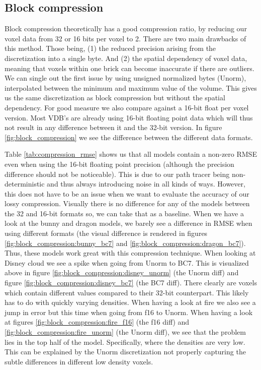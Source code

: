 \subsection{Block compression} \label{results:block_compression}
Block compression theoretically has a good compression ratio, by reducing our voxel data from 32 or 16 bits per voxel to 2. There are two main drawbacks of this method. Those being, (1) the reduced precision arising from the discretization into a single byte. And (2) the spatial dependency of voxel data, meaning that voxels within one brick can become inaccurate if there are outliers. We can single out the first issue by using unsigned normalized bytes (Unorm), interpolated between the minimum and maximum value of the volume. This gives us the same discretization as block compression but without the spatial dependency. For good measure we also compare against a 16-bit float per voxel version. Most VDB's are already using 16-bit floating point data which will thus not result in any difference between it and the 32-bit version. In figure \ref{fig:block_compression} we see the difference between the different data formats. 

Table \ref{tab:compression_rmse} shows us that all models contain a non-zero RMSE even when using the 16-bit floating point precision (although the precision difference should not be noticeable). This is due to our path tracer being non-deterministic and thus always introducing noise in all kinds of ways. However, this does not have to be an issue when we want to evaluate the accuracy of our lossy compression. Visually there is no difference for any of the models between the 32 and 16-bit formats so, we can take that as a baseline. When we have a look at the bunny and dragon models, we barely see a difference in RMSE when using different formats (the visual difference is rendered in figures \ref{fig:block_compression:bunny_bc7} and \ref{fig:block_compression:dragon_bc7}). Thus, these models work great with this compression technique. When looking at Disney cloud we see a spike when going from Unorm to BC7. This is visualized above in figure \ref{fig:block_compression:disney_unorm} (the Unorm diff) and figure \ref{fig:block_compression:disney_bc7} (the BC7 diff). There clearly are voxels which contain different values compared to their 32-bit counterpart. This likely has to do with quickly varying densities. When having a look at fire we also see a jump in error but this time when going from f16 to Unorm. When having a look at figures \ref{fig:block_compression:fire_f16} (the f16 diff) and \ref{fig:block_compression:fire_unorm} (the Unorm diff), we see that the problem lies in the top half of the model. Specifically, where the densities are very low. This can be explained by the Unorm discretization not properly capturing the subtle differences in different low density voxels. 

